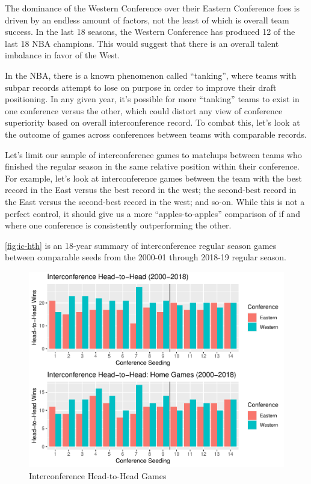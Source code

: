 \documentclass[
    12pt,
    a4paper,
    titlepage,  %
    abstract,  %
    headings=standardclasses,  %
    bibliography=totocnumbered  %
]{scrartcl}
\begin{document}
The dominance of the Western Conference over their Eastern Conference foes is driven by an endless amount of factors, not the least of which is overall team success. In the last 18 seasons, the Western Conference has produced 12 of the last 18 NBA champions. This would suggest that there is an overall talent imbalance in favor of the West.

In the NBA, there is a known phenomenon called ``tanking'', where teams with subpar records attempt to lose on purpose in order to improve their draft positioning. In any given year, it's possible for more ``tanking'' teams to exist in one conference versus the other, which could distort any view of conference superiority based on overall interconference record. To combat this, let's look at the outcome of games across conferences between teams with comparable records.

Let's limit our sample of interconference games to matchups between teams who finished the regular season in the same relative position within their conference. For example, let's look at interconference games between the team with the best record in the East versus the best record in the west; the second-best record in the East versus the second-best record in the west; and so-on. While this is not a perfect control, it should give us a more ``apples-to-apples'' comparison of if and where one conference is consistently outperforming the other.

\autoref{fig:ic-hth} is an 18-year summary of interconference regular season games between comparable seeds from the 2000-01 through 2018-19 regular season.

\begin{figure}[ht]
    \centering
    \includegraphics[width=\linewidth]{ic-hth}
    \caption{Interconference Head-to-Head Games}
    \label{fig:ic-hth}
\end{figure}
\end{document}
